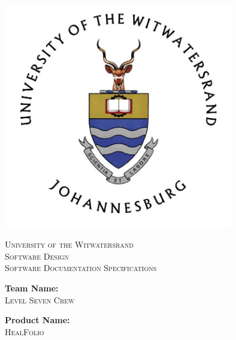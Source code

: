\documentclass[a4paper]{article}
\begin{document}
\begin{titlepage}

\centering

\vfill

\includegraphics[width=10cm]{Wits-logo1.jpg}

\vskip 0.1cm

\center 

\textsc{\LARGE University of the Witwatersrand}\\[0.5cm] 

\textsc{\Large Software Design \\ Software Documentation Specifications} \\[0.5cm] 

\begin{minipage}{0.4\textwidth}

\begin{center} \large

\textbf{Team Name:} \\[0.3cm]

\textsc{Level Seven Crew} \\[0.3cm]

\end{center}

\begin{center} \large

\textbf{Product Name:} \\[0.3cm]

\textsc{HealFolio} \\[0.3cm]

\end{center}


\end{minipage}
\end{titlepage}
\end{document}
